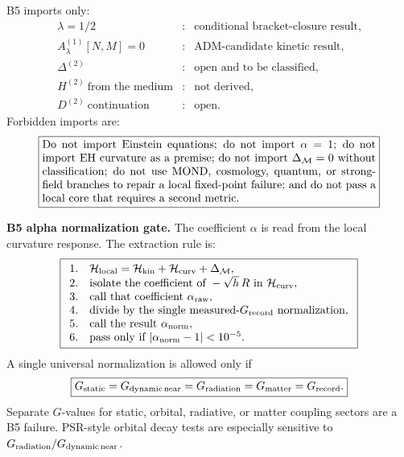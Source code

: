 \documentclass[11pt]{article}
\begin{document}
B5 imports only:
\[
\boxed{
\begin{array}{lll}
\lambda=1/2 &:& \text{conditional bracket-closure result},\\
A_\lambda^{(1)}[N,M]=0 &:& \text{ADM-candidate kinetic result},\\
\Delta^{(2)} &:& \text{open and to be classified},\\
H^{(2)}\ \text{from the medium} &:& \text{not derived},\\
D^{(2)}\ \text{continuation} &:& \text{open}.
\end{array}}
\]
Forbidden imports are:
\[
\boxed{
\begin{minipage}{0.86\linewidth}
Do not import Einstein equations; do not import \(\alpha=1\); do not import
EH curvature as a premise; do not import \(\Delta_{\mathcal M}=0\) without
classification; do not use MOND, cosmology, quantum, or strong-field branches
to repair a local fixed-point failure; and do not pass a local core that
requires a second metric.
\end{minipage}}
\]

\medskip\noindent\textbf{B5 alpha normalization gate.}
The coefficient \(\alpha\) is read from the local curvature response.  The
extraction rule is:
\[
\boxed{
\begin{array}{ll}
1. & {\cal H}_{\rm local}=
{\cal H}_{\rm kin}+{\cal H}_{\rm curv}+\Delta_{\mathcal M},\\
2. & \text{isolate the coefficient of }-\sqrt h\,R\text{ in }
{\cal H}_{\rm curv},\\
3. & \text{call that coefficient }\alpha_{\rm raw},\\
4. & \text{divide by the single measured-}G_{\rm record}\text{ normalization},\\
5. & \text{call the result }\alpha_{\rm norm},\\
6. & \text{pass only if }|\alpha_{\rm norm}-1|<10^{-5}.
\end{array}}
\]
A single universal normalization is allowed only if
\[
\boxed{
G_{\rm static}=G_{\rm dynamic\,near}=G_{\rm radiation}=G_{\rm matter}
=G_{\rm record}.
}
\]
Separate \(G\)-values for static, orbital, radiative, or matter coupling
sectors are a B5 failure.  PSR-style orbital decay tests are especially
sensitive to \(G_{\rm radiation}/G_{\rm dynamic\,near}\).
\end{document}
